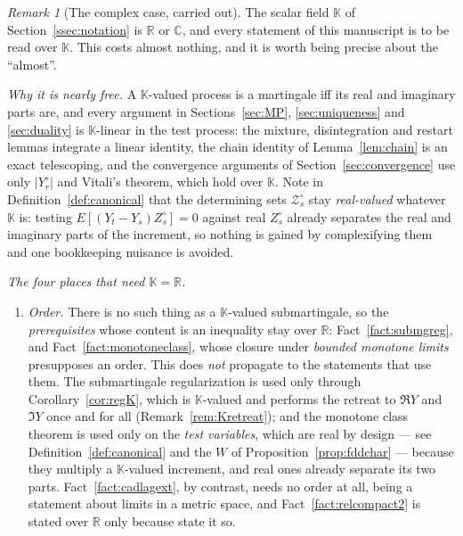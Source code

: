 \documentclass[11pt,a4paper]{article}
\theoremstyle{plain}
\theoremstyle{definition}
\theoremstyle{remark}
\newtheorem{remark}[theorem]{Remark}
\newcommand{\R}{\mathbb{R}}
\newcommand{\K}{\mathbb{K}}
\newcommand{\C}{\mathbb{C}}
\newcommand{\ZZ}{\mathcal{Z}}                  %
\newcommand{\EK}{\cite{EK86}}
\begin{document}
\begin{remark}[The complex case, carried out]
  \label{rem:complexvalued}
  The scalar field $\K$ of Section~\ref{ssec:notation} is $\R$ or $\C$, and every
  statement of this manuscript is to be read over $\K$.  This costs almost
  nothing, and it is worth being precise about the ``almost''.

  \emph{Why it is nearly free.}  A $\K$-valued process is a martingale iff its
  real and imaginary parts are, and every argument in Sections~\ref{sec:MP},
  \ref{sec:uniqueness} and \ref{sec:duality} is $\K$-linear in the test process:
  the mixture, disintegration and restart lemmas integrate a linear identity, the
  chain identity of Lemma~\ref{lem:chain} is an exact telescoping, and the
  convergence arguments of Section~\ref{sec:convergence} use only $|Y^\circ_r|$
  and Vitali's theorem, which hold over $\K$.  Note in
  Definition~\ref{def:canonical} that the determining sets $\ZZ^\circ_s$ stay
  \emph{real-valued} whatever $\K$ is: testing $E[(Y_t - Y_s)Z^\circ_s] = 0$
  against real $Z^\circ_s$ already separates the real and imaginary parts of the
  increment, so nothing is gained by complexifying them and one bookkeeping
  nuisance is avoided.

  \emph{The four places that need $\K = \R$.}
  \begin{enumerate}[label=(\roman*)]
  \item \emph{Order.}  There is no such thing as a $\K$-valued submartingale, so
    the \emph{prerequisites} whose content is an inequality stay over $\R$:
    Fact~\ref{fact:submgreg}, and Fact~\ref{fact:monotoneclass}, whose closure
    under \emph{bounded monotone limits} presupposes an order.  This does
    \emph{not} propagate to the statements that use them.  The submartingale
    regularization is used only through Corollary~\ref{cor:regK}, which is
    $\K$-valued and performs the retreat to $\Re Y$ and $\Im Y$ once and for all
    (Remark~\ref{rem:Kretreat}); and the monotone class theorem is used only on
    the \emph{test variables}, which are real by design --- see
    Definition~\ref{def:canonical} and the $W$ of
    Proposition~\ref{prop:fddchar} --- because they multiply a $\K$-valued
    increment, and real ones already separate its two parts.
    Fact~\ref{fact:cadlagext}, by contrast, needs no order at all, being a
    statement about limits in a metric space, and Fact~\ref{fact:relcompact2} is
    stated over $\R$ only because \EK{} state it so.


\end{enumerate}
\end{remark}
\end{document}
